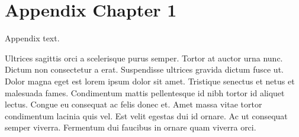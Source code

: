 \documentclass[11pt,a4paper,onecolumn]{report}
\begin{document}
\chapter{Appendix Chapter 1}

Appendix text.

Ultrices sagittis orci a scelerisque purus semper. Tortor at auctor urna nunc. Dictum non consectetur a erat. Suspendisse ultrices gravida dictum fusce ut. Dolor magna eget est lorem ipsum dolor sit amet. Tristique senectus et netus et malesuada fames. Condimentum mattis pellentesque id nibh tortor id aliquet lectus. Congue eu consequat ac felis donec et. Amet massa vitae tortor condimentum lacinia quis vel. Est velit egestas dui id ornare. Ac ut consequat semper viverra. Fermentum dui faucibus in ornare quam viverra orci.


%
%
\end{document}
